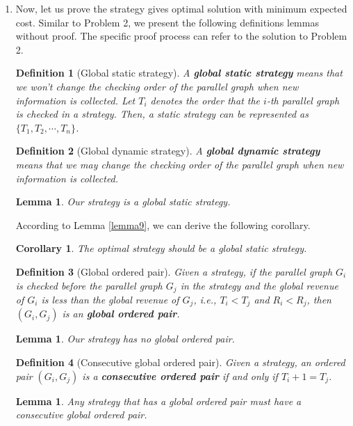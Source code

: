 \documentclass{oxmathproblems}
\makeatletter
\newtheorem{lemma}[theorem]{Lemma}
\newtheorem{corollary}[theorem]{Corollary}
\newtheorem{definition}{Definition}
\theoremstyle{definition}
\renewenvironment{solution}[1][Solution] {\par\pushQED{\qed}\normalfont\topsep6\p@\@plus6\p@\relax\trivlist\item[\hskip\labelsep\bfseries#1\@addpunct{.}]\ignorespaces}{\popQED\endtrivlist\@endpefalse} \makeatother
\makeatother
\begin{document}
\begin{enumerate}
\begin{solution}
	Now, let us prove the strategy gives optimal solution with minimum expected cost. Similar to Problem 2, we present the following definitions lemmas without proof. The specific proof process can refer to the solution to Problem 2.
	
	\begin{definition}[Global static strategy]
	A \textbf{global static strategy} means that we won't change the checking order of the parallel graph when new information is collected. Let $T_i$ denotes the order that the $i$-th parallel graph is checked in a strategy. Then, a static strategy can be represented as $\{T_1, T_2, \cdots, T_n\}$.
	\end{definition}
	\begin{definition}[Global dynamic strategy]
	A \textbf{global dynamic strategy} means that we may change the checking order of the parallel graph when new information is collected.
	\end{definition}
	
	\begin{lemma}\label{lemma10}
		Our strategy is a global static strategy.
	\end{lemma}

	According to Lemma \ref{lemma9}, we can derive the following corollary.
	\begin{corollary}\label{cor11}
		The optimal strategy should be a global static strategy.
	\end{corollary}
	\begin{definition}[Global ordered pair]
		Given a strategy, if the parallel graph $G_i$ is checked before the parallel graph $G_j$ in the strategy and the global revenue of $G_i$ is less than the global revenue of $G_j$, \textit{i.e.}, $T_i < T_j$ and $R_i < R_j$, then $(G_i, G_j)$ is an \textbf{global ordered pair}.
	\end{definition}
	\begin{lemma}\label{lemma12}
		Our strategy has no global ordered pair.
	\end{lemma}
	\begin{definition}[Consecutive global ordered pair] Given a strategy, an ordered pair $(G_i, G_j)$ is a \textbf{consecutive ordered pair} if and only if $T_i+1=T_j$.
	\end{definition}
	\begin{lemma}\label{lemma13}
	Any strategy that has a global ordered pair must have a consecutive global ordered pair.
	\end{lemma}
	

\end{solution}
\end{enumerate}
\end{document}
